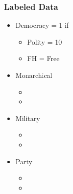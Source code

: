 \documentclass{beamer}
\begin{document}
\begin{frame}
\frametitle{Labeled Data}

\begin{itemize}
	\item Democracy = 1 if
	\begin{itemize}
		\item Polity = 10
		\item FH = Free
	\end{itemize}
	\item Monarchical
	\begin{itemize}
		\item
		\item
	\end{itemize}
	\item Military
		\begin{itemize}
		\item
		\item
	\end{itemize}
	\item Party
		\begin{itemize}
		\item
		\item
	\end{itemize}
\end{itemize}

\end{frame}




\end{document}

